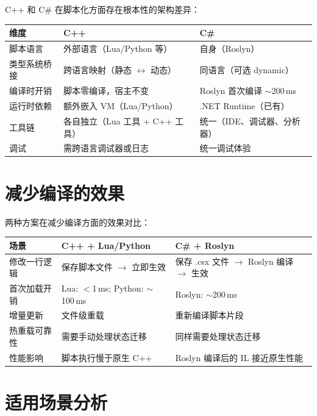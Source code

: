 \documentclass[12pt,a4paper,fontset=fandol]{ctexbook}
\newenvironment{compare}[1][]{%
  \begin{tcolorbox}[enhanced,breakable,
    colback=green!3!white,colframe=green!50!black,
    boxed title style={colback=green!50!black},
    attach boxed title to top left={yshift=-2mm,xshift=2mm},
    arc=2mm,boxrule=0.8mm,
    title={方案对比},#1]}%
  {\end{tcolorbox}}
\begin{document}
C++ 和 C\# 在脚本化方面存在根本性的架构差异：

\begin{compare}[title={根本差异}]
\begin{tabularx}{\textwidth}{lXX}
\toprule
\textbf{维度} & \textbf{C++} & \textbf{C\#} \\
\midrule
脚本语言 & 外部语言（Lua/Python 等） & 自身（Roslyn） \\
类型系统桥接 & 跨语言映射（静态 $\leftrightarrow$ 动态） & 同语言（可选 dynamic） \\
编译时开销 & 脚本零编译，宿主不变 & Roslyn 首次编译 $\sim$200\,ms \\
运行时依赖 & 额外嵌入 VM（Lua/Python） & .NET Runtime（已有） \\
工具链 & 各自独立（Lua 工具 + C++ 工具） & 统一（IDE、调试器、分析器） \\
调试 & 需跨语言调试器或日志 & 统一调试体验 \\
\bottomrule
\end{tabularx}
\end{compare}

\section{减少编译的效果}\label{sec:reduce-compile}

两种方案在减少编译方面的效果对比：

\begin{center}
\begin{tabularx}{\textwidth}{lXX}
\toprule
\textbf{场景} & \textbf{C++ + Lua/Python} & \textbf{C\# + Roslyn} \\
\midrule
修改一行逻辑 & 保存脚本文件 $\to$ 立即生效 & 保存 .csx 文件 $\to$ Roslyn 编译 $\to$ 生效 \\
首次加载开销 & Lua: $<$1\,ms; Python: $\sim$100\,ms & Roslyn: $\sim$200\,ms \\
增量更新 & 文件级重载 & 重新编译脚本片段 \\
热重载可靠性 & 需要手动处理状态迁移 & 同样需要处理状态迁移 \\
性能影响 & 脚本执行慢于原生 C++ & Roslyn 编译后的 IL 接近原生性能 \\
\bottomrule
\end{tabularx}
\end{center}

\section{适用场景分析}\label{sec:use-cases}
\end{document}
